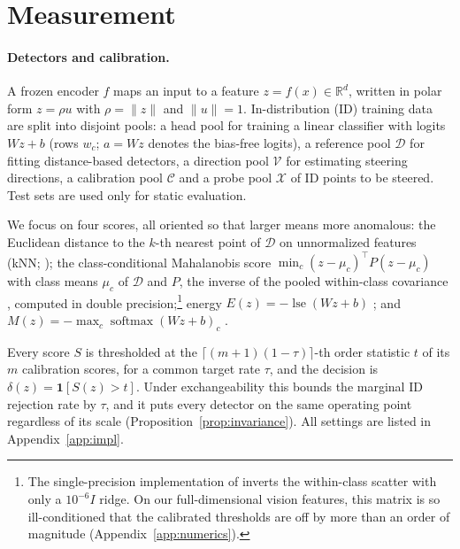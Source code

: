 \documentclass[twoside]{article}
\theoremstyle{definition}
\theoremstyle{remark}
\DeclareMathOperator{\lse}{lse}
\DeclareMathOperator{\softmax}{softmax}
\newcommand{\R}{\mathbb{R}}
\begin{document}
\section{Measurement}\label{sec:protocol}

\paragraph{Detectors and calibration.}
A frozen encoder $f$ maps an input to a feature $z=f(x)\in\R^d$, written in polar form $z=\rho u$ with
$\rho=\|z\|$ and $\|u\|=1$. In-distribution (ID) training data are split into disjoint pools: a head pool
for training a linear classifier with logits $Wz+b$ (rows $w_c$; $a=Wz$ denotes the bias-free logits),
a reference pool $\mathcal{D}$ for fitting distance-based detectors, a direction pool $\mathcal{V}$ for
estimating steering directions, a calibration pool $\mathcal{C}$ and a probe pool $\mathcal{X}$ of ID
points to be steered. Test sets are used only for static evaluation.

We focus on four scores, all oriented so that larger means more anomalous: the Euclidean distance to the
$k$-th nearest point of $\mathcal{D}$ on unnormalized features (kNN; \citep{sun2022knn}); the
class-conditional Mahalanobis score $\min_c (z-\mu_c)^\top P(z-\mu_c)$ with class means $\mu_c$ of
$\mathcal{D}$ and $P$, the inverse of the pooled within-class covariance
\citep{lee2018mahalanobis}, computed in double precision;\footnote{The single-precision
implementation of \citet{kirchheim2022pytorchood} inverts the within-class scatter with only a $10^{-6}I$
ridge. On our full-dimensional vision features, this matrix is so ill-conditioned that the calibrated
thresholds are off by more than an order of magnitude (Appendix~\ref{app:numerics}).} energy
$E(z)=-\lse(Wz+b)$ \citep{liu2020energy}; and $M(z)=-\max_c\softmax(Wz+b)_c$
\citep{hendrycks2017baseline}.

Every score $S$ is thresholded at the $\lceil(m+1)(1-\tau)\rceil$-th order statistic $t$ of its $m$
calibration scores, for a common target rate $\tau$, and the decision is $\delta(z)=\mathbf{1}[S(z)>t]$.
Under exchangeability this bounds the marginal ID rejection rate by $\tau$, and it puts every detector on the
same operating point regardless of its scale (Proposition~\ref{prop:invariance}). All settings are listed in
Appendix~\ref{app:impl}.
\end{document}
